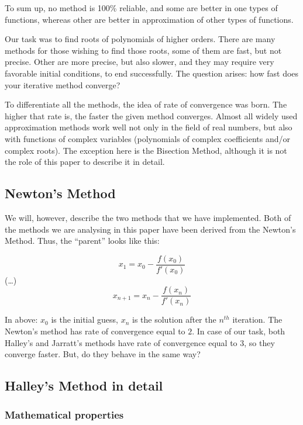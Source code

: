\documentclass{article}
\begin{document}
To sum up, no method is 100\% reliable, and some are better in one types of functions, whereas
other are better in approximation of other types of functions.

Our task was to find roots of polynomials of higher orders. There are many methods for those
wishing to find those roots, some of them are fast, but not precise. Other are more precise, but
also slower, and they may require very favorable initial conditions, to end successfully. The
question arises: how fast does your iterative method converge?

To differentiate all the methods, the idea of rate of convergence was born. The higher that rate
is, the faster the given method converges. Almost all widely used approximation methods work well
not only in the field of real numbers, but also with functions of complex variables (polynomials of
complex coefficients and/or complex roots). The exception here is the Bisection Method, although it
is not the role of this paper to describe it in detail.

\subsection{Newton's Method}

We will, however, describe the two methods that we have implemented. Both of the methods we are
analysing in this paper have been derived from the Newton's Method. Thus, the ``parent'' looks like
this:

\begin{center}
\[ x_1 = x_0 - \frac{f(x_0)}{f'(x_0)} \]
(\ldots)
\[ x_{n+1} = x_n - \frac{f(x_n)}{f'(x_n)} \]
\end{center}

In above: $x_0$ is the initial guess, $x_n$ is the solution after the $n^{th}$ iteration. The
Newton's method has rate of convergence equal to $2$. In case of our task, both Halley's and
Jarratt's methods have rate of convergence equal to $3$, so they converge faster. But, do they
behave in the same way?

\subsection{Halley's Method in detail}

\subsubsection{Mathematical properties}
\end{document}
